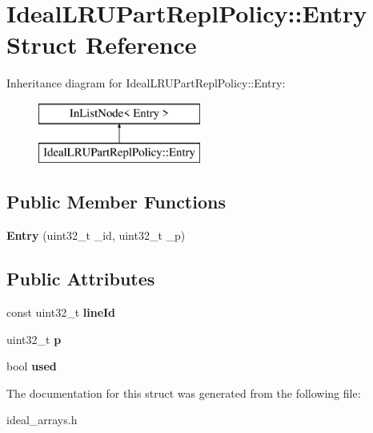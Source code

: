 \hypertarget{structIdealLRUPartReplPolicy_1_1Entry}{\section{Ideal\-L\-R\-U\-Part\-Repl\-Policy\-:\-:Entry Struct Reference}
\label{structIdealLRUPartReplPolicy_1_1Entry}
}
Inheritance diagram for Ideal\-L\-R\-U\-Part\-Repl\-Policy\-:\-:Entry\-:\begin{figure}[H]
\begin{center}
\leavevmode
\includegraphics[height=2.000000cm]{structIdealLRUPartReplPolicy_1_1Entry}
\end{center}
\end{figure}
\subsection*{Public Member Functions}
\begin{DoxyCompactItemize}
\item 
\hypertarget{structIdealLRUPartReplPolicy_1_1Entry_a83695ad1156d89ac833e458d6a5ea06c}{{\bfseries Entry} (uint32\-\_\-t \-\_\-id, uint32\-\_\-t \-\_\-p)}\label{structIdealLRUPartReplPolicy_1_1Entry_a83695ad1156d89ac833e458d6a5ea06c}

\end{DoxyCompactItemize}
\subsection*{Public Attributes}
\begin{DoxyCompactItemize}
\item 
\hypertarget{structIdealLRUPartReplPolicy_1_1Entry_a1036b5b4211c71dec55fb44c7747627c}{const uint32\-\_\-t {\bfseries line\-Id}}\label{structIdealLRUPartReplPolicy_1_1Entry_a1036b5b4211c71dec55fb44c7747627c}

\item 
\hypertarget{structIdealLRUPartReplPolicy_1_1Entry_abce594ee5f688615813e2f4ef97edde3}{uint32\-\_\-t {\bfseries p}}\label{structIdealLRUPartReplPolicy_1_1Entry_abce594ee5f688615813e2f4ef97edde3}

\item 
\hypertarget{structIdealLRUPartReplPolicy_1_1Entry_a17a8f5416e0db77d26a96751bd14e01f}{bool {\bfseries used}}\label{structIdealLRUPartReplPolicy_1_1Entry_a17a8f5416e0db77d26a96751bd14e01f}

\end{DoxyCompactItemize}


The documentation for this struct was generated from the following file\-:\begin{DoxyCompactItemize}
\item 
ideal\-\_\-arrays.\-h\end{DoxyCompactItemize}
